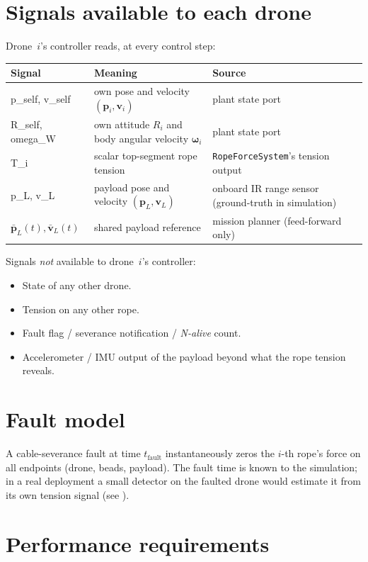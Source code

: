 \documentclass[11pt,a4paper,oneside]{report}
\newcommand{\bp}{\bm{p}}
\newcommand{\bv}{\bm{v}}
\newcommand{\bomega}{\bm{\omega}}
\begin{document}
\section{Signals available to each drone}

Drone~$i$'s controller reads, at every control step:

\begin{longtable}{>{\ttfamily}p{} p{} p{}}
\toprule
\textbf{Signal} & \textbf{Meaning} & \textbf{Source} \\
\midrule
p\_self, v\_self & own pose and velocity $(\bp_i, \bv_i)$ & plant state port \\
R\_self, omega\_W & own attitude $R_i$ and body angular velocity $\bomega_i$ & plant state port \\
T\_i & scalar top-segment rope tension & \texttt{RopeForceSystem}'s tension output \\
p\_L, v\_L & payload pose and velocity $(\bp_L, \bv_L)$ & onboard IR range sensor (ground-truth in simulation) \\
$\bar{\bp}_L(t), \bar{\bv}_L(t)$ & shared payload reference & mission planner (feed-forward only) \\
\bottomrule
\end{longtable}

Signals \emph{not} available to drone~$i$'s controller:

\begin{itemize}
\item State of any other drone.
\item Tension on any other rope.
\item Fault flag / severance notification / \emph{N-alive} count.
\item Accelerometer / IMU output of the payload beyond what the rope
tension reveals.
\end{itemize}

\section{Fault model}

A cable-severance fault at time $t_{\text{fault}}$ instantaneously
zeros the $i$-th rope's force on all endpoints (drone, beads,
payload). The fault time is known to the simulation; in a real
deployment a small detector on the faulted drone would estimate it
from its own tension signal (see ).

\section{Performance requirements}
\end{document}
